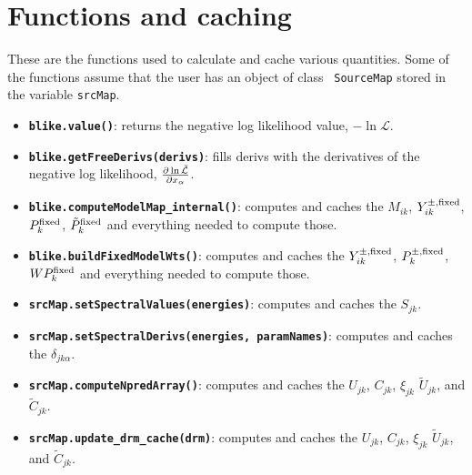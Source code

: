 \documentclass[preprint]{aastex}
\begin{document}
\section{Functions and caching}\label{app:functions}

These are the functions used to calculate and cache various quantities.
Some of the functions assume that the user has an object of class {\tt
  SourceMap} stored in the variable {\tt srcMap}.

\begin{itemize}
\item{ {\bf {\tt blike.value()}}: returns the negative log
    likelihood value, $-\ln \mathcal{L}$.}
\item{ {\bf {\tt blike.getFreeDerivs(derivs)}}: fills derivs
    with the derivatives of the negative log likelihood,
    $\frac{\partial \-\ln \tilde{\mathcal{L}}}{\partial x_{\alpha}}$.}
\item{ {\bf {\tt blike.computeModelMap\_internal()}}: computes
    and caches the $M_{ik}$, $Y_{ik}^{\pm,\rm fixed}$, $P_{k}^{\rm
      fixed}$, $\tilde{P}_{k}^{\rm fixed}$ and everything needed to compute
    those.}
\item{ {\bf {\tt blike.buildFixedModelWts()}}: computes and
    caches the $Y_{ik}^{\pm,\rm fixed}$, $P_{k}^{\pm, \rm fixed}$,
    $WP_{k}^{\rm fixed}$ and everything needed to compute those.}
\item{ {\bf {\tt srcMap.setSpectralValues(energies)}}: computes and
    caches the $S_{jk}$.}
\item{ {\bf {\tt srcMap.setSpectralDerivs(energies, paramNames)}}:
    computes and caches the $\delta_{jk\alpha}$.}
\item{ {\bf {\tt srcMap.computeNpredArray()}}: computes and caches the
    $U_{jk}$, $C_{jk}$, $\xi_{jk}$ $\tilde{U}_{jk}$, and $\tilde{C}_{jk}$.}
\item{ {\bf {\tt srcMap.update\_drm\_cache(drm)}}: computes and caches
    the $U_{jk}$, $C_{jk}$, $\xi_{jk}$ $\tilde{U}_{jk}$, and $\tilde{C}_{jk}$.}
\end{itemize}
\end{document}
